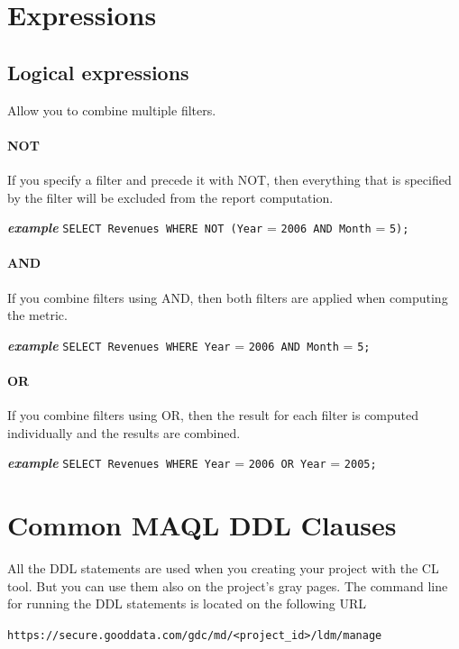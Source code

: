 \documentclass[a4paper, 12pt, titlepage, fleqn]{article}
\begin{document}
\section{Expressions}
\subsection{Logical expressions}
\label{logical}
Allow you to combine multiple filters.

\paragraph*{NOT} If you specify a filter and precede it with NOT, then everything that is specified by the filter will be excluded from the report computation.

\textbf{\emph{example}}  \hspace{.9cm}\verb=SELECT Revenues WHERE NOT (Year= = \verb=2006 AND Month= = \verb=5);=

\paragraph*{AND} If you combine filters using AND, then both filters are applied when computing the metric.

\textbf{\emph{example}}  \hspace{.9cm}\verb=SELECT Revenues WHERE Year= = \verb=2006 AND Month= = \verb=5;=

\paragraph*{OR} If you combine filters using OR, then the result for each filter is computed individually and the results are combined.

\textbf{\emph{example}}  \hspace{.9cm}\verb=SELECT Revenues WHERE Year= = \verb=2006 OR Year= = \verb=2005;=

\section{Common MAQL DDL Clauses}
\label{DDL}

All the DDL statements are used when you creating your project with the CL tool. But you can use them also on the project's gray pages. The command line for running the DDL statements is located on the following URL

\verb=https://secure.gooddata.com/gdc/md/<project_id>/ldm/manage=
\end{document}
